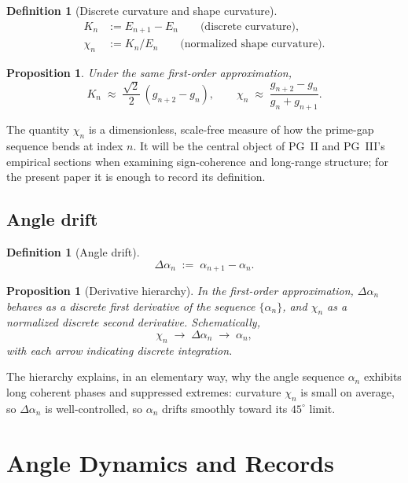 \documentclass[11pt]{article}
\newtheorem{proposition}[theorem]{Proposition}
\newtheorem{definition}[theorem]{Definition}
\begin{document}
\begin{definition}[Discrete curvature and shape curvature]
\begin{align*}
K_n &:= E_{n+1} - E_n \qquad \text{(discrete curvature)},\\
\chi_n &:= K_n / E_n \qquad \text{(normalized shape curvature)}.
\end{align*}
\end{definition}

\begin{proposition}\label{prop:chi}
Under the same first-order approximation,
\[
K_n \;\approx\; \frac{\sqrt{2}}{2}\,(g_{n+2} - g_n),
\qquad
\chi_n \;\approx\; \frac{g_{n+2} - g_n}{g_n + g_{n+1}}.
\]
\end{proposition}

The quantity $\chi_n$ is a dimensionless, scale-free measure of how
the prime-gap sequence bends at index $n$. It will be the central
object of PG~II and PG~III's empirical sections when examining
sign-coherence and long-range structure; for the present paper it is
enough to record its definition.

\subsection{Angle drift}

\begin{definition}[Angle drift]
\[
\Delta \alpha_n \;:=\; \alpha_{n+1} - \alpha_n.
\]
\end{definition}

\begin{proposition}[Derivative hierarchy]\label{prop:hierarchy}
In the first-order approximation, $\Delta \alpha_n$ behaves as a
discrete first derivative of the sequence $\{\alpha_n\}$, and
$\chi_n$ as a normalized discrete second derivative. Schematically,
\[
\chi_n \;\longrightarrow\; \Delta \alpha_n \;\longrightarrow\; \alpha_n,
\]
with each arrow indicating discrete integration.
\end{proposition}

The hierarchy explains, in an elementary way, why the angle sequence
$\alpha_n$ exhibits long coherent phases and suppressed extremes:
curvature $\chi_n$ is small on average, so $\Delta\alpha_n$ is
well-controlled, so $\alpha_n$ drifts smoothly toward its $45^\circ$
limit.

\section{Angle Dynamics and Records}\label{sec:angle-records}
\end{document}
